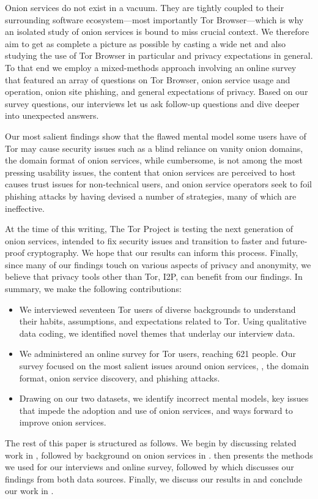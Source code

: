 Onion services do not exist in a vacuum.  They are tightly coupled to their
surrounding software ecosystem---most importantly Tor Browser---which is why an
isolated study of onion services is bound to miss crucial context.  We therefore
aim to get as complete a picture as possible by casting a wide net and also
studying the use of Tor Browser in particular and privacy expectations in
general.  To that end we employ a mixed-methods approach involving an online
survey that featured an array of questions on Tor Browser, onion service usage
and operation, onion site phishing, and general expectations of privacy.  Based
on our survey questions, our interviews let us ask follow-up questions and dive
deeper into unexpected answers.

Our most salient findings show that \first the flawed mental model some users
have of Tor may cause security issues such as a blind reliance on vanity onion
domains, \second the domain format of onion services, while cumbersome, is not
among the most pressing usability issues, \third the content that onion services
are perceived to host causes trust issues for non-technical users, and \fourth
onion service operators seek to foil phishing attacks by having devised a number
of strategies, many of which are ineffective.

At the time of this writing, The Tor Project is testing the next generation of
onion services, intended to fix security issues and transition to faster and
future-proof cryptography.  We hope that our results can inform this process.
Finally, since many of our findings touch on various aspects of privacy and
anonymity, we believe that privacy tools other than Tor, \eg I2P, can benefit
from our findings.  In summary, we make the following contributions:

\begin{itemize}
    \item We interviewed seventeen Tor users of diverse backgrounds to
        understand their habits, assumptions, and expectations related to Tor.
        Using qualitative data coding, we identified novel themes that underlay
        our interview data.

    \item We administered an online survey for Tor users, reaching 621 people.
        Our survey focused on the most salient issues around onion services,
        \eg, the domain format, onion service discovery, and phishing attacks.

    \item Drawing on our two datasets, we identify \first incorrect mental
        models, \second key issues that impede the adoption and use of onion
        services, and \third ways forward to improve onion services.
\end{itemize}

The rest of this paper is structured as follows.  We begin by discussing related
work in , followed by background on onion services in
.   then presents the methods we used for
our interviews and online survey, followed by  which discusses
our findings from both data sources.  Finally, we discuss our results in
 and conclude our work in .
